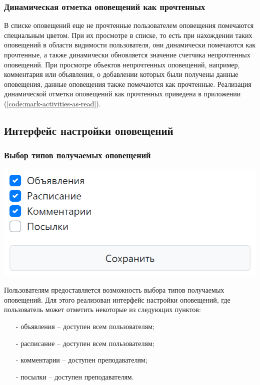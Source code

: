 \documentclass[12pt, a4paper, oneside]{article}
\begin{document}
\subsubsection{Динамическая отметка оповещений как прочтенных}
В списке оповещений еще не прочтенные пользователем оповещения помечаются специальным цветом. При их просмотре в списке, то есть при нахождении таких оповещений в области видимости пользователя, они динамически помечаются как прочтенные, а также динамически обновляется значение счетчика непрочтенных оповещений. При просмотре объектов непрочтенных оповещений, например, комментария или объявления, о добавлении которых были получены данные оповещения, данные оповещения также помечаются как прочтенные. Реализация динамической отметки оповещений как прочтенных приведена в приложении (\ref{code:mark-activities-as-read}).
\subsection{Интерфейс настройки оповещений}
\subsubsection{Выбор типов получаемых оповещений}
\begin{center}
    \includegraphics[scale=0.45]{activity-settings}
\end{center}

Пользователям предоставляется возможность выбора типов получаемых оповещений. Для этого реализован интерфейс настройки оповещений, где пользователь может отметить некоторые из следующих пунктов:
\begin{itemize}
    \item [-] объявления – доступен всем пользователям;
    \item [-] расписание – доступен всем пользователям;
    \item [-] комментарии – доступен преподавателям;
    \item [-] посылки – доступен преподавателям.
\end{itemize}
\end{document}
